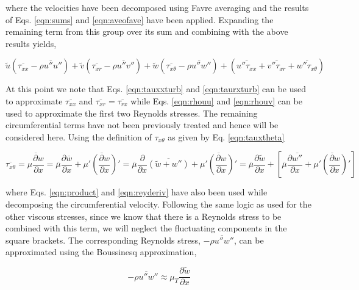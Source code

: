 	where the velocities have been decomposed using Favre averaging and the results of Eqs. \ref{eqn:sums} and
\ref{eqn:aveofave} have been applied.  Expanding the remaining term from this group over its sum and 
combining with the above results yields,

\begin{displaymath}
	\tilde u (\overline{\tau_{xx}} - \overline{\rho u'' u''}) + \tilde v (\overline{\tau_{xr}} 
	- \overline{\rho u'' v''}) + \tilde w(\overline{\tau_{x\theta}} - \overline{\rho u'' w''})
	+ (\overline{u''\tau_{xx}} + \overline{v''\tau_{xr}} + \overline{w''\tau_{x\theta}})
\end{displaymath}

	At this point we note that Eqs. \ref{eqn:tauxxturb} and \ref{eqn:taurxturb} can be used
to approximate $\overline{\tau_{xx}}$ and $\overline{\tau_{xr}} = \overline{\tau_{rx}}$ while
Eqs. \ref{eqn:rhouu} and \ref{eqn:rhouv} can be used to approximate the first two Reynolds stresses.
The remaining circumferential terms have not been previously treated and hence will be considered here.
Using the definition of $\tau_{x\theta}$ as given by Eq. \ref{eqn:tauxtheta}

\begin{displaymath}
	\overline{\tau_{x\theta}} = \overline{\mu\frac{\partial w}{\partial x}} =
	\overline{\mu}\frac{\partial \overline{w}}{\partial x} + \overline{\mu'(\frac{\partial w}{\partial x})'} = 
	\overline{\mu}\frac{\partial}{\partial x}\overline{(\tilde w + w'')} + \overline{\mu'(\frac{\partial w}{\partial x})'} =
	\overline{\mu}\frac{\partial \tilde w}{\partial x} + [\overline{\mu}\frac{\partial \overline{w''}}{\partial x} +
	\overline{\mu'(\frac{\partial w}{\partial x})'}]	
\end{displaymath}

	where Eqs. \ref{eqn:product} and \ref{eqn:reyderiv} have also been used while decomposing the
circumferential velocity.  Following the same logic as used for the other viscous stresses, since we know that there 
is a Reynolds stress to be combined with this term, we will neglect the fluctuating components in the square brackets.  
The corresponding Reynolds stress, $-\overline{\rho u'' w''}$, can be approximated using the Boussinesq approximation,

\begin{equation}
	-\overline{\rho u'' w''} \approx \mu_T  \frac{\partial \tilde w}{\partial x}
\label{eqn:rhouw}
\end{equation}

